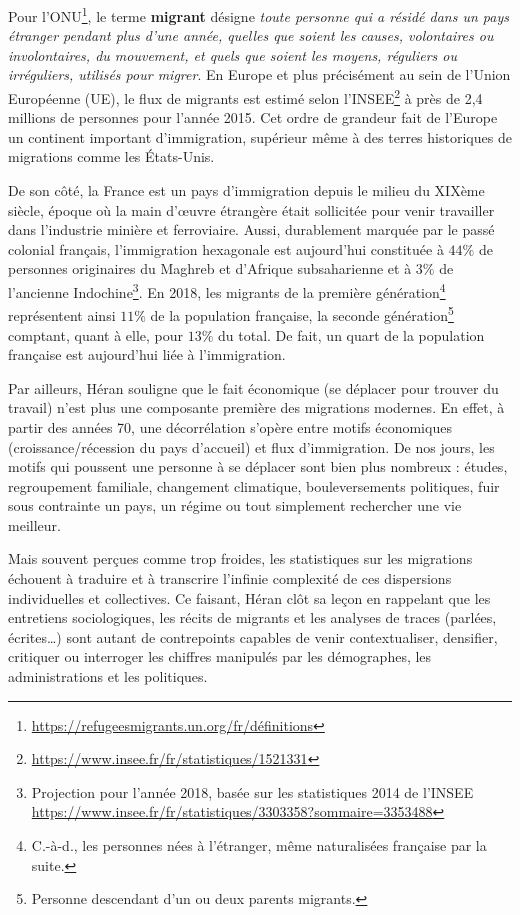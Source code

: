 \documentclass[symmetric,justified,marginals=raggedouter]{tufte-book}
\begin{document}
Pour l'ONU\footnote{\RaggedOuter \url{https://refugeesmigrants.un.org/fr/définitions}}, le terme \textbf{migrant} désigne \og\textit{toute personne qui a résidé dans un pays étranger pendant plus d'une année, quelles que soient les causes, volontaires ou involontaires, du mouvement, et quels que soient les moyens, réguliers ou irréguliers, utilisés pour migrer}\fg{}. En Europe et plus précisément au sein de l'Union Européenne (UE), le flux de migrants est estimé selon l'INSEE\footnote{\RaggedOuter \url{https://www.insee.fr/fr/statistiques/1521331}} à près de 2,4 millions de personnes pour l'année 2015. Cet ordre de grandeur fait de l'Europe un continent important d'immigration, supérieur même à des terres historiques de migrations comme les États-Unis. 

De son côté, la France est un pays d'immigration depuis le milieu du XIXème siècle, époque où la main d'œuvre étrangère était sollicitée pour venir travailler dans l'industrie minière et ferroviaire. Aussi, durablement marquée par le passé colonial français, l'immigration hexagonale est aujourd'hui constituée à $44\%$ de personnes originaires du Maghreb et d'Afrique subsaharienne et à $3\%$ de l'ancienne Indochine\footnote{\RaggedOuter Projection pour l'année 2018, basée sur les statistiques 2014 de l'INSEE  \url{https://www.insee.fr/fr/statistiques/3303358?sommaire=3353488}}. En 2018, les migrants de la première génération\footnote{\RaggedOuter C.-à-d., les personnes nées à l'étranger, même naturalisées française par la suite.} représentent ainsi $11\%$ de la population française, la seconde génération\footnote{\RaggedOuter Personne descendant d'un ou deux parents migrants.} comptant, quant à elle, pour $13\%$ du total. De fait, un quart de la population française est aujourd'hui liée à l'immigration.

Par ailleurs, Héran souligne que le fait économique (se déplacer pour trouver du travail) n'est plus une composante première des migrations modernes. En effet, à partir des années 70, une décorrélation s'opère entre motifs économiques (croissance/récession du pays d'accueil) et flux d'immi\-gration. De nos jours, les motifs qui poussent une personne à se déplacer sont bien plus nombreux : études, regroupement familiale, changement climatique, bouleversements politiques, fuir sous contrain\-te un pays, un régime ou tout simplement rechercher une vie meilleur.   

Mais souvent perçues comme trop froides, les statistiques sur les migrations échouent à traduire et à transcrire l'infinie complexité de ces dispersions individuelles et collectives. Ce faisant, Héran clôt sa leçon en rappelant que les entretiens sociologiques, les récits de migrants et les analyses de traces (parlées, écrites\ldots{}) sont autant de contrepoints capables de venir contextualiser, densifier, critiquer ou interroger les chiffres manipulés par les démographes, les administrations et les politiques.
\end{document}
